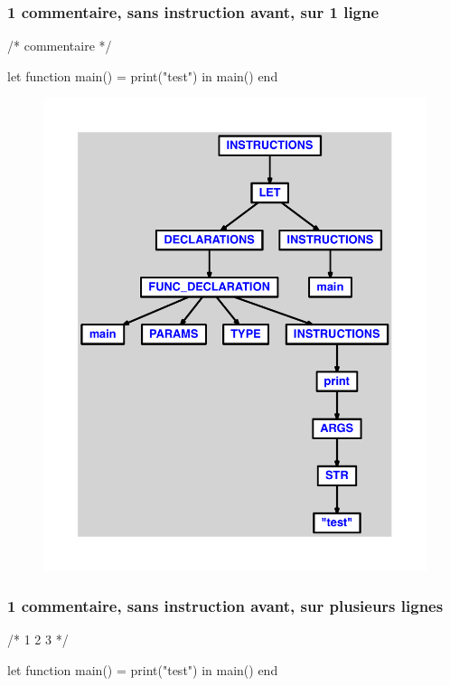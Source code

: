 \documentclass{article}
\begin{document}
\subsubsection{1 commentaire, sans instruction avant, sur 1 ligne}
\begin{verbatimtab}
/* commentaire */

let
	function main() = print("test")
in main() end
\end{verbatimtab}
\begin{figure}[H]\centering\includegraphics[max width=\textwidth]{ast/ast_150.pdf}\end{figure}\subsubsection{1 commentaire, sans instruction avant, sur plusieurs lignes}
\begin{verbatimtab}
/*
1
2
3
*/

let
	function main() = print("test")
in main() end
\end{verbatimtab}
\end{document}
